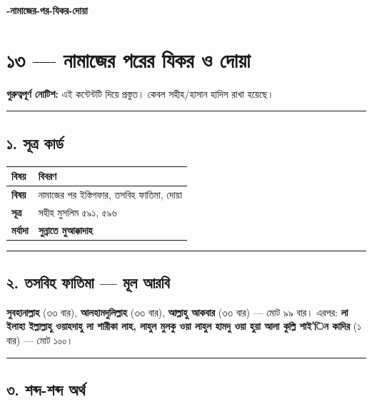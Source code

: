 

\begin{center}{\Large\bfseries\color{emerald} -নামাজের-পর-যিকর-দোয়া}\end{center}
\vspace{1em}
\section*{১৩ — নামাজের পরের যিকর ও দোয়া}

\begin{warnbox}
 \textbf{গুরুত্বপূর্ণ নোটিশ:} এই কন্টেন্টটি  দিয়ে প্রস্তুত। কেবল সহীহ/হাসান হাদিস রাখা হয়েছে।
\end{warnbox}

\medskip\hrule\medskip

\subsection*{১. সূত্র কার্ড}

\begin{table}[h]\centering\small
\begin{tabular}{ll}
বিষয় & বিবরণ \\
\hline
\textbf{বিষয়} & নামাজের পর ইস্তিগফার, তসবিহ ফাতিমা, দোয়া \\
\textbf{সূত্র} & সহীহ মুসলিম ৫৯১, ৫৯৬ \\
\textbf{মর্যাদা} & \textbf{সুন্নাতে মুআক্কাদাহ} \\
\hline
\end{tabular}
\end{table}

\medskip\hrule\medskip

\subsection*{২. তসবিহ ফাতিমা — মূল আরবি}

\textbf{সুবহানাল্লাহ} (৩৩ বার), \textbf{আলহামদুলিল্লাহ} (৩৩ বার), \textbf{আল্লাহু আকবার} (৩৩ বার) — মোট ৯৯ বার। এরপর: \textbf{লা ইলাহা ইল্লাল্লাহু ওয়াহদাহু লা শারীকা লাহ, লাহুল মুলকু ওয়া লাহুল হামদু ওয়া হুয়া আলা কুল্লি শাই'িন কাদির} (১ বার) — মোট ১০০।

\medskip\hrule\medskip

\subsection*{৩. শব্দ-শব্দ অর্থ}

